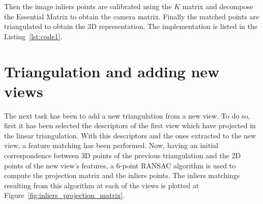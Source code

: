 \documentclass{ethz_report}
\begin{document}
Then the image inliers points are calibrated using the $K$ matrix and decompose the Essential Matrix
to obtain the camera matrix. Finally the matched points are triangulated to obtain the 3D representation. The implementation is listed in the Listing~\ref{lst:code1}.



\section*{Triangulation and adding new views}

The next task has been to add a new triangulation from a new view. To do so, first it has been selected the descriptors of the first view which have projected in the linear triangulation. With this descriptors and the ones extracted to the new view, a feature matching has been performed. Now, having an initial correspondence between 3D points of the previous triangulation and the 2D points of the new view's features, a 6-point RANSAC algorithm is used to compute the projection matrix and the inliers points. The inliers matchings resulting from this algorithm at each of the views is plotted at Figure~\ref{fig:inliers_projection_matrix}.
\end{document}
